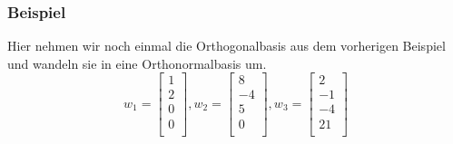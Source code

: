 \documentclass{article}
\begin{document}
			\subsubsection*{Beispiel}
				Hier nehmen wir noch einmal die Orthogonalbasis aus dem vorherigen Beispiel und wandeln sie in eine Orthonormalbasis um.
				\begin{equation*}
					w_1 = \begin{bmatrix} 1 \\ 2 \\ 0 \\ 0 \\ \end{bmatrix}, 
					w_2 = \begin{bmatrix} 8 \\ -4 \\ 5 \\ 0 \\ \end{bmatrix}, 
					w_3 = \begin{bmatrix} 2 \\ -1 \\ -4 \\ 21 \\ \end{bmatrix}
				\end{equation*}
\end{document}

